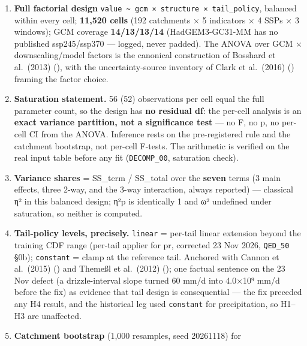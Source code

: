 \documentclass[
  english,
  11pt,
]{article}
\providecommand{\tightlist}{%
  \setlength{\itemsep}{0pt}\setlength{\parskip}{0pt}}
\begin{document}
\begin{itemize}
  \begin{enumerate}
  \def\labelenumi{\arabic{enumi}.}
  \tightlist
  \item
    \textbf{Full factorial design}
    \texttt{value\ \textasciitilde{}\ gcm\ ×\ structure\ ×\ tail\_policy},
    balanced within every cell; \textbf{11,520 cells} (192 catchments ×
    5 indicators × 4 SSPs × 3 windows); GCM coverage
    \textbf{14/13/13/14} (HadGEM3-GC31-MM has no published ssp245/ssp370
    --- logged, never padded). The ANOVA over GCM × downscaling/model
    factors is the canonical construction of Bosshard et al.~(2013)
    (), with
    the uncertainty-source inventory of Clark et al.~(2016)
    () framing
    the factor choice.
  \item
    \textbf{Saturation statement.} 56 (52) observations per cell equal
    the full parameter count, so the design has \textbf{no residual df}:
    the per-cell analysis is an \textbf{exact variance partition, not a
    significance test} --- no F, no p, no per-cell CI from the ANOVA.
    Inference rests on the pre-registered rule and the catchment
    bootstrap, not per-cell F-tests. The arithmetic is verified on the
    real input table before any fit (\texttt{DECOMP\_00}, saturation
    check).
  \item
    \textbf{Variance shares} = SS\_term / SS\_total over the
    \textbf{seven} terms (3 main effects, three 2-way, and the 3-way
    interaction, always reported) --- classical η² in this balanced
    design; η²p is identically 1 and ω² undefined under saturation, so
    neither is computed.
  \item
    \textbf{Tail-policy levels, precisely.} \texttt{linear} = per-tail
    linear extension beyond the training CDF range (per-tail applier for
    pr, corrected 23 Nov 2026, \texttt{QED\_50} §0b); \texttt{constant}
    = clamp at the reference tail. Anchored with Cannon et al.~(2015)
    () and Themeßl et
    al.~(2012) ();
    one factual sentence on the 23 Nov defect (a drizzle-interval slope
    turned 60 mm/d into 4.0×10⁹ mm/d before the fix) as evidence that
    tail design is consequential --- the fix preceded any H4 result, and
    the historical leg used \texttt{constant} for precipitation, so
    H1--H3 are unaffected.
  \item
    \textbf{Catchment bootstrap} (1,000 resamples, seed 20261118) for

\end{enumerate}
\end{itemize}
\end{document}
